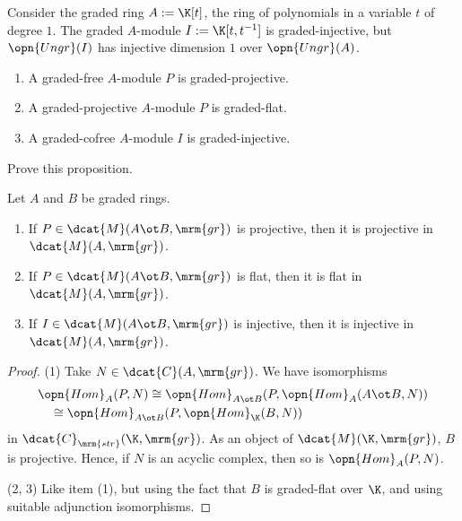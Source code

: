 \begin{exa} \label{exa:3800}
Consider the graded ring $A := \K[t]$, the ring of polynomials in a variable 
$t$ of degree $1$. The graded $A$-module $I := \K[t, t^{-1}]$ is 
graded-injective, but $\opn{Ungr}(I)$ has injective dimension $1$ over 
$\opn{Ungr}(A)$. 
\end{exa}

\begin{prop} \label{prop:4905}  %
\mbox{}
\begin{enumerate}
\item A graded-free $A$-module $P$ is graded-projective. 

\item A graded-projective $A$-module $P$ is graded-flat.

\item A graded-cofree $A$-module $I$ is graded-injective. 
\end{enumerate}
\end{prop}

\begin{exer} \label{exer:4045}
Prove this proposition. 
\end{exer}

\begin{prop} \label{prop:3900}
Let $A$ and $B$ be graded rings.
\begin{enumerate}
\item If $P \in \dcat{M}(A \ot B, \mrm{gr})$ is projective, then it is 
projective in $\dcat{M}(A, \mrm{gr})$.

\item If $P \in \dcat{M}(A \ot B, \mrm{gr})$ is flat, then it is 
flat in $\dcat{M}(A, \mrm{gr})$.

\item If $I \in \dcat{M}(A \ot B, \mrm{gr})$ is injective, then it is 
injective in $\dcat{M}(A, \mrm{gr})$.
\end{enumerate}
\end{prop}

\begin{proof}
(1) Take $N \in \dcat{C}(A, \mrm{gr})$. 
We have isomorphisms
\[ \begin{aligned}
& \opn{Hom}_{A}(P, N) \cong
\opn{Hom}_{A \ot B}(P, \opn{Hom}_A(A \ot B, N)) 
\\ & \quad  \cong \opn{Hom}_{A \ot B}(P, \opn{Hom}_{\K}(B, N)) 
\end{aligned} \]
in $\dcat{C}_{\mrm{str}}(\K, \mrm{gr})$. 
As an object of $\dcat{M}(\K, \mrm{gr})$, $B$ is projective.
Hence, if $N$ is an acyclic complex, then so is $\opn{Hom}_{A}(P, N)$.

\medskip \noindent
(2, 3) Like item (1), but using the fact that $B$ is graded-flat over $\K$, and 
using suitable adjunction isomorphisms.
\end{proof}

